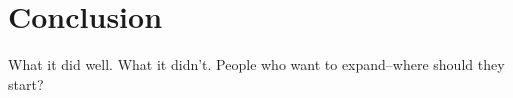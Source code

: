 
\chapter{Conclusion}

What it did well. What it didn't. People who want to expand--where should they start? 